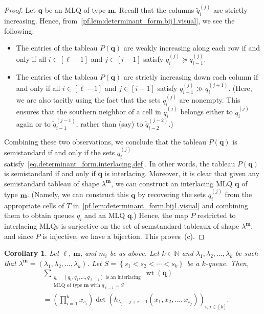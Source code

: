 \documentclass[reqno]{amsart}
\newcommand{\0}{\phantom{c}}
\DeclareMathOperator{\wt}{wt} %
\newcommand{\mm}{\mathbf{m}}
\newcommand{\qq}{\mathbf{q}}
\newcommand{\NN}{\mathbb{N}}
\let\sumnonlimits\sum
\let\prodnonlimits\prod
\renewcommand{\sum}{\sumnonlimits\limits}
\renewcommand{\prod}{\prodnonlimits\limits}
\newcommand{\set}[1]{\left\{ #1 \right\}}
\newcommand{\tup}[1]{\left( #1 \right)}
\newcommand{\ive}[1]{\left[ #1 \right]}
\theoremstyle{plain}
\newtheorem{cor}[thm]{Corollary}
\theoremstyle{definition}
\numberwithin{equation}{section}
\begin{document}
\begin{proof}
Let $\qq$ be an MLQ of type $\mm$.
Recall that the columns $\widetilde{q}_i^{(j)}$ are strictly increasing.
Hence, from~\eqref{pf.lem:determinant_form.bij1.visual}, we see the following:
\begin{itemize}
\item The entries of the tableau $P(\qq)$ are weakly increasing along each row if and only if all $i \in \ive{\ell-1}$ and $j \in \ive{i-1}$ satisfy $q_i^{(j)} \succeq q_{i-1}^{(j)}$.
\item The entries of the tableau $P(\qq)$ are strictly increasing down each column if and only if all $i \in \ive{\ell-1}$ and $j \in \ive{i-1}$ satisfy $q_{i-1}^{(j)} \gg q_i^{(j+1)}$.
  (Here, we are also tacitly using the fact that the sets $q_i^{(j)}$ are nonempty.
  This ensures that the southern neighbor of a cell in $\widetilde{q}_i^{(j)}$ belongs either to $\widetilde{q}_i^{(j)}$ again or to $\widetilde{q}_{i-1}^{(j-1)}$, rather than (say) to $\widetilde{q}_{i-2}^{(j-2)}$.)
\end{itemize}
Combining these two observations, we conclude that the tableau $P(\qq)$ is semistandard if and only if the sets $q_i^{(j)}$ satisfy~\eqref{eq.determinant_form.interlacing.def}.
In other words, the tableau $P(\qq)$ is semistandard if and only if $\qq$ is interlacing.
Moreover, it is clear that given any semistandard tableau of shape $\lambda^{\mm}$, we can construct an interlacing MLQ $\qq$ of type $\mm$.
(Namely, we can construct this $\qq$ by recovering the sets $q_i^{(j)}$ from the appropriate cells of $T$ in~\eqref{pf.lem:determinant_form.bij1.visual} and combining them to obtain queues $q_i$ and an MLQ $\qq$.)
Hence, the map $P$ restricted to interlacing MLQs is surjective on the set of semstandard tableaux of shape $\lambda^{\mm}$, and since $P$ is injective, we have a bijection.
This proves~(c).
\end{proof}

\begin{cor}
\label{cor:determinant_form.bij1c}
Let $\ell$, $\mm$, and $m_i$ be as above.
Let $k \in \NN$ and $\lambda_1, \lambda_2, \ldots, \lambda_k$ be such that $\lambda^{\mm} = \tup{\lambda_1, \lambda_2, \dotsc, \lambda_k}$.
Let $S = \set{s_1 < s_2 < \cdots < s_k}$ be a $k$-queue.
Then,
\begin{align*}
&  \sum_{\substack{\qq=\tup{q_1,q_2,\ldots,q_{\ell-1}} \text{ is an interlacing}\\\text{MLQ of type $\mm$ with } q_{\ell-1}=S}} \wt(\qq) \\
&  = \left(  \prod_{i=1}^{k}x_{s_i}\right)
    \det\left(h_{\lambda_j-j+i-1}(x_1, x_2, \dotsc, x_{s_j}) \right)_{i, j \in \ive{k}} .
\end{align*}
\end{cor}
\end{document}

